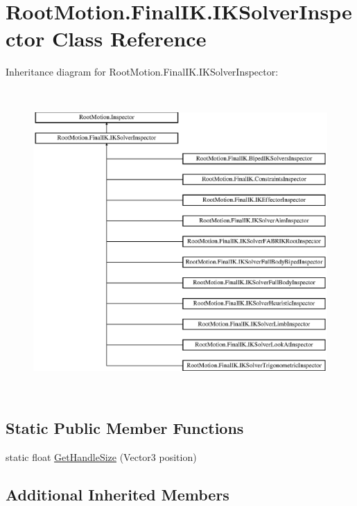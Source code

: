 \hypertarget{class_root_motion_1_1_final_i_k_1_1_i_k_solver_inspector}{}\section{Root\+Motion.\+Final\+I\+K.\+I\+K\+Solver\+Inspector Class Reference}
\label{class_root_motion_1_1_final_i_k_1_1_i_k_solver_inspector}
Inheritance diagram for Root\+Motion.\+Final\+I\+K.\+I\+K\+Solver\+Inspector\+:\begin{figure}[H]
\begin{center}
\leavevmode
\includegraphics[height=11.666667cm]{class_root_motion_1_1_final_i_k_1_1_i_k_solver_inspector}
\end{center}
\end{figure}
\subsection*{Static Public Member Functions}
\begin{DoxyCompactItemize}
\item 
static float \mbox{\hyperlink{class_root_motion_1_1_final_i_k_1_1_i_k_solver_inspector_aa8356b302f158d55e794d48a0da54a61}{Get\+Handle\+Size}} (Vector3 position)
\end{DoxyCompactItemize}
\subsection*{Additional Inherited Members}



